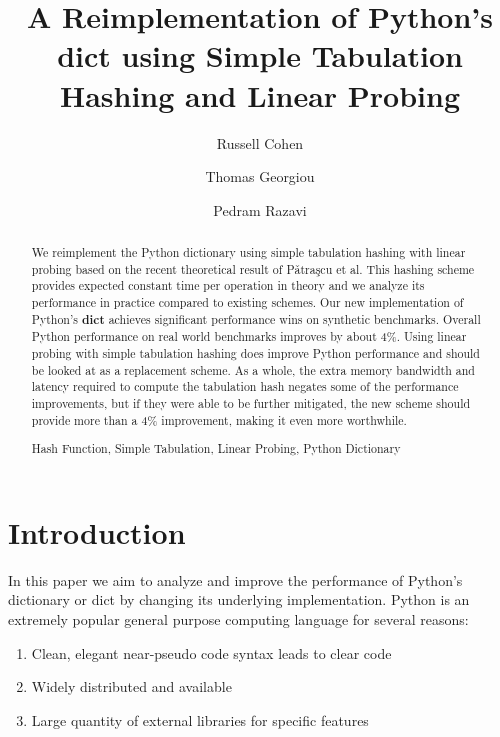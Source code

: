 \documentclass[runningheads,a4paper]{llncs}
\newcommand{\keywords}[1]{\par\addvspace\baselineskip
\noindent\keywordname\enspace\ignorespaces#1}
\begin{document}
\mainmatter  %

\title{A Reimplementation of Python's dict using Simple Tabulation Hashing and Linear Probing}


\author{Russell Cohen\and Thomas Georgiou\and Pedram Razavi}
%


\maketitle


\begin{abstract}
We reimplement the Python dictionary using simple tabulation hashing with linear probing based on the recent theoretical result of P\v{a}tra\c{s}cu et al. This hashing scheme provides expected constant time per operation in theory and we analyze its performance in practice compared to existing schemes.
Our new implementation of Python's \textbf{dict} achieves significant performance wins on synthetic benchmarks.  
Overall Python performance on real world benchmarks improves by about 4\%.
Using linear probing with simple tabulation hashing does improve Python performance
and should be looked at as a replacement scheme.  As a whole, the
extra memory bandwidth
and latency required to compute the tabulation hash negates some of the
performance improvements, but if they were able to be further mitigated, the new scheme
should provide more than a 4\% improvement, making it even more worthwhile.
\keywords{Hash Function, Simple Tabulation, Linear Probing, Python Dictionary}
\end{abstract}


\section{Introduction}
In this paper we aim to analyze and improve the performance of Python's
dictionary or dict by changing its underlying implementation.  Python \cite{python} is an extremely popular general purpose computing language for several reasons:
\begin{enumerate}
 \item Clean, elegant near-pseudo code syntax leads to clear code 
 \item Widely distributed and available
 \item Large quantity of external libraries for specific features 
\end{enumerate}
\end{document}
